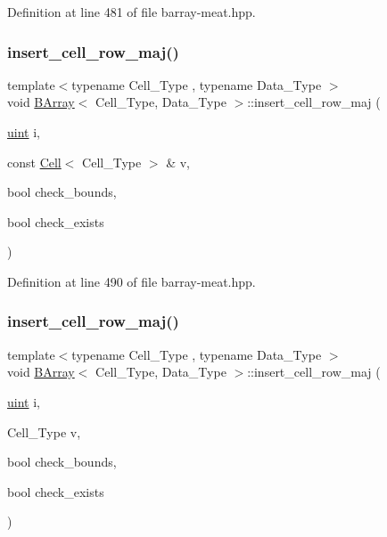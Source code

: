 Definition at line 481 of file barray-\/meat.\+hpp.

\mbox{\label{class_b_array_a32ce549812fcac0af0a39c3ba0a22add}} 
\subsubsection{\texorpdfstring{insert\+\_\+cell\+\_\+row\+\_\+maj()}{insert\_cell\_row\_maj()}\hspace{0.1cm}{\footnotesize\ttfamily [1/2]}}
{\footnotesize\ttfamily template$<$typename Cell\+\_\+\+Type , typename Data\+\_\+\+Type $>$ \\
void \hyperlink{class_b_array}{B\+Array}$<$ Cell\+\_\+\+Type, Data\+\_\+\+Type $>$\+::insert\+\_\+cell\+\_\+row\+\_\+maj (\begin{DoxyParamCaption}\item[{\hyperlink{typedefs_8hpp_a91ad9478d81a7aaf2593e8d9c3d06a14}{uint}}]{i,  }\item[{const \hyperlink{class_cell}{Cell}$<$ Cell\+\_\+\+Type $>$ \&}]{v,  }\item[{bool}]{check\+\_\+bounds,  }\item[{bool}]{check\+\_\+exists }\end{DoxyParamCaption})\hspace{0.3cm}{\ttfamily [inline]}}



Definition at line 490 of file barray-\/meat.\+hpp.

\mbox{\label{class_b_array_aec0c657e14fd003cc6d4428a816d28aa}} 
\subsubsection{\texorpdfstring{insert\+\_\+cell\+\_\+row\+\_\+maj()}{insert\_cell\_row\_maj()}\hspace{0.1cm}{\footnotesize\ttfamily [2/2]}}
{\footnotesize\ttfamily template$<$typename Cell\+\_\+\+Type , typename Data\+\_\+\+Type $>$ \\
void \hyperlink{class_b_array}{B\+Array}$<$ Cell\+\_\+\+Type, Data\+\_\+\+Type $>$\+::insert\+\_\+cell\+\_\+row\+\_\+maj (\begin{DoxyParamCaption}\item[{\hyperlink{typedefs_8hpp_a91ad9478d81a7aaf2593e8d9c3d06a14}{uint}}]{i,  }\item[{Cell\+\_\+\+Type}]{v,  }\item[{bool}]{check\+\_\+bounds,  }\item[{bool}]{check\+\_\+exists }\end{DoxyParamCaption})\hspace{0.3cm}{\ttfamily [inline]}}



